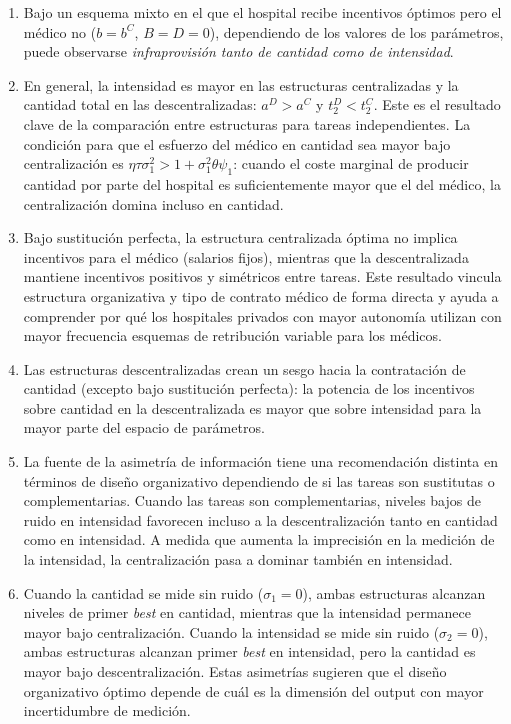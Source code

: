 \begin{enumerate}[label=(\roman*)]
  \item Bajo un esquema mixto en el que el hospital recibe incentivos óptimos pero el médico no ($b=b^C$, $B=D=0$), dependiendo de los valores de los parámetros, puede observarse \textit{infraprovisión tanto de cantidad como de intensidad}.

  \item En general, la intensidad es mayor en las estructuras centralizadas y la cantidad total en las descentralizadas: $a^D>a^C$ y $t_2^D<t_2^C$. Este es el resultado clave de la comparación entre estructuras para tareas independientes. La condición para que el esfuerzo del médico en cantidad sea mayor bajo centralización es $\eta\tau\sigma_1^2>1+\sigma_1^2\theta\psi_1$: cuando el coste marginal de producir cantidad por parte del hospital es suficientemente mayor que el del médico, la centralización domina incluso en cantidad.

  \item Bajo sustitución perfecta, la estructura centralizada óptima no implica incentivos para el médico (salarios fijos), mientras que la descentralizada mantiene incentivos positivos y simétricos entre tareas. Este resultado vincula estructura organizativa y tipo de contrato médico de forma directa y ayuda a comprender por qué los hospitales privados con mayor autonomía utilizan con mayor frecuencia esquemas de retribución variable para los médicos.

  \item Las estructuras descentralizadas crean un sesgo hacia la contratación de cantidad (excepto bajo sustitución perfecta): la potencia de los incentivos sobre cantidad en la descentralizada es mayor que sobre intensidad para la mayor parte del espacio de parámetros.

  \item La fuente de la asimetría de información tiene una recomendación distinta en términos de diseño organizativo dependiendo de si las tareas son sustitutas o complementarias. Cuando las tareas son complementarias, niveles bajos de ruido en intensidad favorecen incluso a la descentralización tanto en cantidad como en intensidad. A medida que aumenta la imprecisión en la medición de la intensidad, la centralización pasa a dominar también en intensidad.

  \item Cuando la cantidad se mide sin ruido ($\sigma_1=0$), ambas estructuras alcanzan niveles de primer \textit{best} en cantidad, mientras que la intensidad permanece mayor bajo centralización. Cuando la intensidad se mide sin ruido ($\sigma_2=0$), ambas estructuras alcanzan primer \textit{best} en intensidad, pero la cantidad es mayor bajo descentralización. Estas asimetrías sugieren que el diseño organizativo óptimo depende de cuál es la dimensión del output con mayor incertidumbre de medición.
\end{enumerate}


